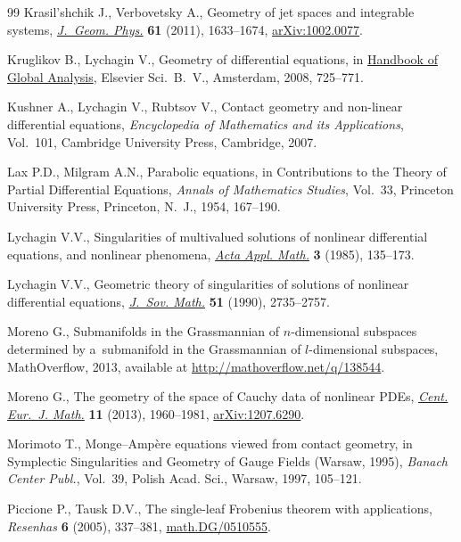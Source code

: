 \begin{thebibliography}{99}
Krasil'shchik J., Verbovetsky A., Geometry of jet spaces and integrable
 systems, \href{http://dx.doi.org/10.1016/j.geomphys.2010.10.012}{\textit{J.~Geom. Phys.}} \textbf{61} (2011), 1633--1674,
 \href{http://arxiv.org/abs/1002.0077}{arXiv:1002.0077}.

Kruglikov B., Lychagin V., Geometry of dif\/ferential equations, in \href{http://dx.doi.org/10.1016/B978-044452833-9.50015-2}{Handbook of
 Global Analysis}, Elsevier Sci.~B.~V., Amsterdam, 2008, 725--771.

Kushner A., Lychagin V., Rubtsov V., Contact geometry and non-linear
 dif\/ferential equations, \textit{Encyclopedia of Mathematics and its
 Applications}, Vol.~101, Cambridge University Press, Cambridge, 2007.

Lax P.D., Milgram A.N., Parabolic equations, in Contributions to the Theory of
 Partial Dif\/ferential Equations, \textit{Annals of Mathematics Studies},
 Vol.~33, Princeton University Press, Princeton, N.~J., 1954, 167--190.

Lychagin V.V., Singularities of multivalued solutions of nonlinear dif\/ferential
 equations, and nonlinear phenomena, \href{http://dx.doi.org/10.1007/BF00580702}{\textit{Acta Appl. Math.}} \textbf{3}
 (1985), 135--173.

Lychagin V.V., Geometric theory of singularities of solutions of nonlinear
 dif\/ferential equations, \href{http://dx.doi.org/10.1007/BF01095431}{\textit{J.~Sov. Math.}} \textbf{51} (1990),
 2735--2757.

Moreno G., Submanifolds in the Grassmannian of $n$-dimensional subspaces
 determined by a~sub\-ma\-ni\-fold in the Grassmannian of $l$-dimensional subspaces,
 MathOverf\/low, 2013, available at \url{http://mathoverflow.net/q/138544}.

Moreno G., The geometry of the space of {C}auchy data of nonlinear {PDE}s,
 \href{http://dx.doi.org/10.2478/s11533-013-0292-y}{\textit{Cent. Eur.~J. Math.}} \textbf{11} (2013), 1960--1981,
 \href{http://arxiv.org/abs/1207.6290}{arXiv:1207.6290}.

Morimoto T., Monge--{A}mp\`ere equations viewed from contact geometry, in
 Symplectic Singularities and Geometry of Gauge Fields ({W}arsaw, 1995),
 \textit{Banach Center Publ.}, Vol.~39, Polish Acad. Sci., Warsaw, 1997,
 105--121.

Piccione P., Tausk D.V., The single-leaf {F}robenius theorem with applications,
 \textit{Resenhas} \textbf{6} (2005), 337--381, \href{http://arxiv.org/abs/math.DG/0510555}{math.DG/0510555}.


\end{thebibliography}
